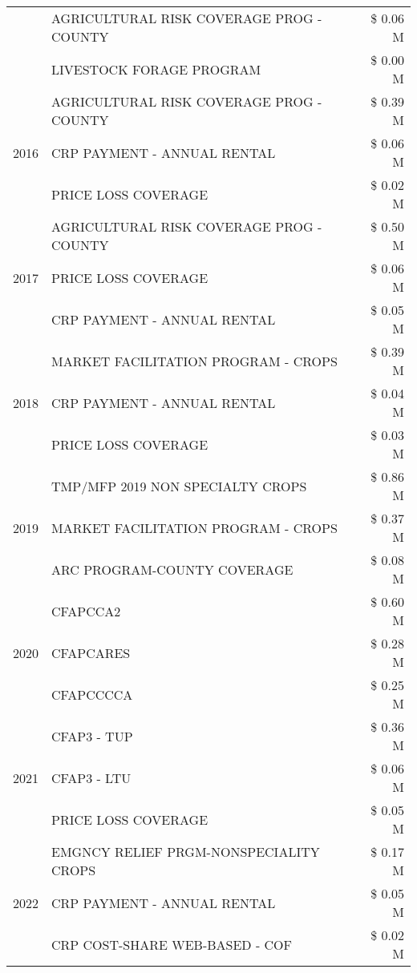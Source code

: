 \begin{tabular}{llr}
 & AGRICULTURAL RISK COVERAGE PROG - COUNTY & \$ 0.06 M \\
 & LIVESTOCK FORAGE PROGRAM & \$ 0.00 M \\
\cline{1-3}
\multirow[t]{3}{*}{2016} & AGRICULTURAL RISK COVERAGE PROG - COUNTY & \$ 0.39 M \\
 & CRP PAYMENT - ANNUAL RENTAL & \$ 0.06 M \\
 & PRICE LOSS COVERAGE & \$ 0.02 M \\
\cline{1-3}
\multirow[t]{3}{*}{2017} & AGRICULTURAL RISK COVERAGE PROG - COUNTY & \$ 0.50 M \\
 & PRICE LOSS COVERAGE & \$ 0.06 M \\
 & CRP PAYMENT - ANNUAL RENTAL & \$ 0.05 M \\
\cline{1-3}
\multirow[t]{3}{*}{2018} & MARKET FACILITATION PROGRAM - CROPS & \$ 0.39 M \\
 & CRP PAYMENT - ANNUAL RENTAL & \$ 0.04 M \\
 & PRICE LOSS COVERAGE & \$ 0.03 M \\
\cline{1-3}
\multirow[t]{3}{*}{2019} & TMP/MFP 2019 NON SPECIALTY CROPS & \$ 0.86 M \\
 & MARKET FACILITATION PROGRAM - CROPS & \$ 0.37 M \\
 & ARC PROGRAM-COUNTY COVERAGE & \$ 0.08 M \\
\cline{1-3}
\multirow[t]{3}{*}{2020} & CFAPCCA2 & \$ 0.60 M \\
 & CFAPCARES & \$ 0.28 M \\
 & CFAPCCCCA & \$ 0.25 M \\
\cline{1-3}
\multirow[t]{3}{*}{2021} & CFAP3 - TUP & \$ 0.36 M \\
 & CFAP3 - LTU & \$ 0.06 M \\
 & PRICE LOSS COVERAGE & \$ 0.05 M \\
\cline{1-3}
\multirow[t]{3}{*}{2022} & EMGNCY RELIEF PRGM-NONSPECIALITY CROPS & \$ 0.17 M \\
 & CRP PAYMENT - ANNUAL RENTAL & \$ 0.05 M \\
 & CRP COST-SHARE WEB-BASED - COF & \$ 0.02 M \\
\cline{1-3}
\bottomrule
\end{tabular}
